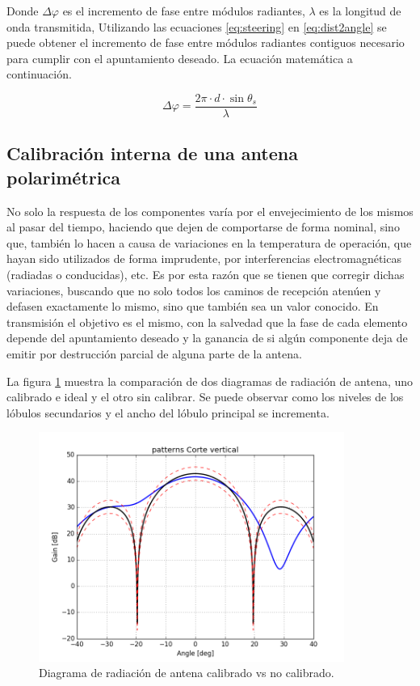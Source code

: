 Donde $\Delta\varphi$ es el incremento de fase entre módulos radiantes, $\lambda$ es la longitud de onda transmitida, 
Utilizando las ecuaciones \ref{eq:steering} en \ref{eq:dist2angle} se puede obtener el incremento de fase entre módulos radiantes
contiguos necesario para cumplir con el apuntamiento deseado. La ecuación matemática a continuación.

\begin{equation}
	\Delta\varphi = \dfrac{2\pi\cdot d\cdot\sin{\theta_s}}{\lambda}
\end{equation}

\subsection{Calibración interna de una antena polarimétrica}

No solo la respuesta de los componentes varía por el envejecimiento de los mismos al pasar del tiempo, haciendo que dejen de
comportarse de forma nominal, sino que, también lo hacen a causa de variaciones en la temperatura de operación, que hayan sido
utilizados de forma imprudente, por interferencias electromagnéticas (radiadas o conducidas), etc. Es por esta razón que se 
tienen que corregir dichas variaciones, buscando que no solo todos los caminos de recepción atenúen y defasen exactamente lo
mismo, sino que también sea un valor conocido. En transmisión el objetivo es el mismo, con la salvedad que la fase de cada 
elemento depende del apuntamiento deseado y la ganancia de si algún componente deja de emitir por destrucción parcial de alguna
parte de la antena.

La figura \ref{fig:nonCalPattern} muestra la comparación de dos diagramas de radiación de antena, uno calibrado e ideal y el 
otro sin calibrar. Se puede observar como los niveles de los lóbulos secundarios y el ancho del lóbulo principal se incrementa.

\begin{figure}[H]
 \centering
 \includegraphics[width=10cm]{gfx/nonCalPattern.png}
 \caption{Diagrama de radiación de antena calibrado vs no calibrado.}
 \label{fig:nonCalPattern}
\end{figure}

